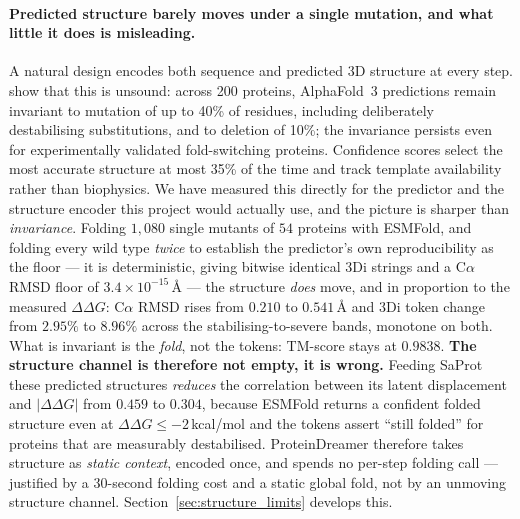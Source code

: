 \documentclass[12pt, a4paper]{article}
\begin{document}
\paragraph{Predicted structure barely moves under a single mutation, and what little it does is misleading.} A natural design encodes both sequence and predicted 3D structure at every step. \citet{feldman2026invariance} show that this is unsound: across 200 proteins, AlphaFold~3 predictions remain invariant to mutation of up to 40\% of residues, including deliberately destabilising substitutions, and to deletion of 10\%; the invariance persists even for experimentally validated fold-switching proteins. Confidence scores select the most accurate structure at most 35\% of the time and track template availability rather than biophysics. We have measured this directly for the predictor and the structure encoder this project would actually use, and the picture is sharper than \textit{invariance}. Folding $1{,}080$ single mutants of $54$ proteins with ESMFold, and folding every wild type \textit{twice} to establish the predictor's own reproducibility as the floor --- it is deterministic, giving bitwise identical $3$Di strings and a C$\alpha$ RMSD floor of $3.4\times10^{-15}$\,\AA{} --- the structure \textit{does} move, and in proportion to the measured $\Delta\Delta G$: C$\alpha$ RMSD rises from $0.210$ to $0.541$\,\AA{} and $3$Di token change from $2.95\%$ to $8.96\%$ across the stabilising-to-severe bands, monotone on both. What is invariant is the \textit{fold}, not the tokens: TM-score stays at $0.9838$. \textbf{The structure channel is therefore not empty, it is wrong.} Feeding SaProt these predicted structures \textit{reduces} the correlation between its latent displacement and $\lvert\Delta\Delta G\rvert$ from $0.459$ to $0.304$, because ESMFold returns a confident folded structure even at $\Delta\Delta G \leq -2$\,kcal/mol and the tokens assert ``still folded'' for proteins that are measurably destabilised. ProteinDreamer therefore takes structure as \textit{static context}, encoded once, and spends no per-step folding call --- justified by a $30$-second folding cost and a static global fold, not by an unmoving structure channel. Section~\ref{sec:structure_limits} develops this.
\end{document}
